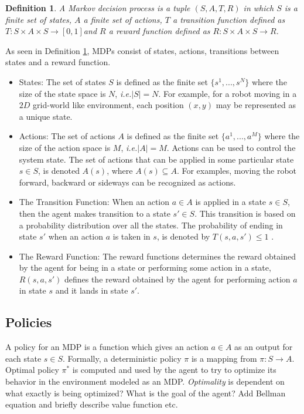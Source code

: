 \documentclass[12pt]{report}
\newtheorem{mydef}{Definition}
\newcommand{\ie}{\textit{i.e.}}
\begin{document}
\begin{mydef}
\label{mdp_def}
A Markov decision process is a tuple $(S, A, T, R)$ in which $S$ is a finite set of states, $A$ a finite set of actions, $T$ a transition function defined as $T : S \times A \times S \rightarrow [0, 1] $and $R$ a reward function defined
as $R : S \times A \times S \rightarrow R$.
\end{mydef}

As seen in Definition \ref{mdp_def}, MDPs consist of states, actions, transitions between states and a reward function.
\begin{itemize}
\item States: The set of states $S$ is defined as the finite set $\{s^1,...,s^N\}$ where the size of the state space is $N$, \ie $|S| = N$. For example, for a robot moving in a $2D$ grid-world like environment, each position $(x,y)$ may be represented as a unique state.

\item Actions: The set of actions $A$ is defined as the finite set $\{a^1,...,a^M\}$ where the size of the action space is $M$, \ie $|A| = M$. Actions can be used to control the system state. The set of actions that can be applied in some particular state $s \in S$, is denoted $A(s)$,
where $A(s) \subseteq A$. For examples, moving the robot forward, backward or sideways can be recognized as actions.

\item The Transition Function: 
\label{transition_function}
When an action $a \in A$ is applied in a state $s \in S$, then the agent makes transition to a state $s' \in S$. This transition is based on a probability distribution over all the states. The probability of ending in state $s'$ when an action $a$ is taken in $s$, is denoted by $T(s,a,s') \leq 1$ .

\item The Reward Function:
\label{reward_function}
The reward functions determines the reward obtained by the agent for being in a state or performing some action in a state, $R(s,a,s')$ defines the reward obtained by the agent for performing action $a$ in state $s$ and it lands in state $s'$.
\end{itemize}

\subsection{Policies}
\label{policies}
A policy for an MDP is a function which gives an action $a \in A$ as an output for each state $s \in S$. Formally, a deterministic policy $\pi$ is a mapping from $\pi: S \rightarrow A$. Optimal policy $\pi^*$ is computed and used by the agent to try to optimize its behavior in the environment modeled as an MDP. \textit{Optimality} is dependent on what exactly is being optimized? What is the goal of the agent? {\color{red} Add Bellman equation and briefly describe value function etc.} 
\end{document}
